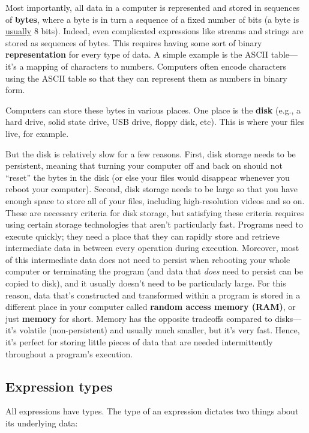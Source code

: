 \documentclass{article}
\begin{document}
Most importantly, all data in a computer is represented and stored in sequences of \textbf{bytes}, where a byte is in turn a sequence of a fixed number of bits (a byte is \ul{usually} 8 bits). Indeed, even complicated expressions like streams and strings are stored as sequences of bytes. This requires having some sort of binary \textbf{representation} for every type of data. A simple example is the ASCII table---it's a mapping of characters to numbers. Computers often encode characters using the ASCII table so that they can represent them as numbers in binary form.

Computers can store these bytes in various places. One place is the \textbf{disk} (e.g., a hard drive, solid state drive, USB drive, floppy disk, etc). This is where your files live, for example.

But the disk is relatively slow for a few reasons. First, disk storage needs to be persistent, meaning that turning your computer off and back on should not ``reset'' the bytes in the disk (or else your files would disappear whenever you reboot your computer). Second, disk storage needs to be large so that you have enough space to store all of your files, including high-resolution videos and so on. These are necessary criteria for disk storage, but satisfying these criteria requires using certain storage technologies that aren't particularly fast. Programs need to execute quickly; they need a place that they can rapidly store and retrieve intermediate data in between every operation during execution. Moreover, most of this intermediate data does not need to persist when rebooting your whole computer or terminating the program (and data that \textit{does} need to persist can be copied to disk), and it usually doesn't need to be particularly large. For this reason, data that's constructed and transformed within a program is stored in a different place in your computer called \textbf{random access memory (RAM)}, or just \textbf{memory} for short. Memory has the opposite tradeoffs compared to disks---it's volatile (non-persistent) and usually much smaller, but it's very fast. Hence, it's perfect for storing little pieces of data that are needed intermittently throughout a program's execution.

\subsection{Expression types}

All expressions have types. The type of an expression dictates two things about its underlying data:
\end{document}
